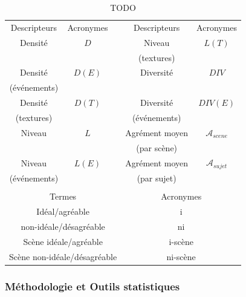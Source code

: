 \begin{table}[t]
\centering
\begin{tabular}{c c c c c} 
Descripteurs          & Acronymes   &   & Descripteurs            & Acronymes  \\                       
\cline{1-2} \cline{4-5}
Densité               & $D$         &   & Niveau                  & $L(T)$    \\
                      &             &   & (textures)              &          \\
Densité               & $D(E)$      &   & Diversité               & $DIV$ \\
(événements)          &             &   &                         &          \\
Densité               & $D(T)$      &   & Diversité               & $DIV(E)$ \\
(textures)            &             &   & (événements)            &          \\
Niveau                & $L$         &   & Agrément moyen          & $\mathcal{A}_{scene}$     \\
                      &             &   & (par scène)              &         \\
Niveau                & $L(E)$      &   & Agrément moyen          & $\mathcal{A}_{sujet}$        \\
(événements)          &             &   & (par sujet)             &      \\
                      &             &   &                         &      \\
\multicolumn{3}{c}{Termes} &  \multicolumn{2}{c}{Acronymes} \\ 
\hline
\multicolumn{3}{c}{Idéal/agréable}                 & \multicolumn{2}{c}{i}       \\
\multicolumn{3}{c}{non-idéale/désagréable}         & \multicolumn{2}{c}{ni}      \\
\multicolumn{3}{c}{Scène idéale/agréable}          & \multicolumn{2}{c}{i-scène} \\
\multicolumn{3}{c}{Scène non-idéale/désagréable}   & \multicolumn{2}{c}{ni-scène} \\
\hline
\end{tabular}
\vspace{0.5mm}
\caption{TODO}
\label{tab:acronyme}
\end{table}

\subsubsection{Méthodologie et Outils statistiques}
\label{sec:ch5_methodoEtStat1}

